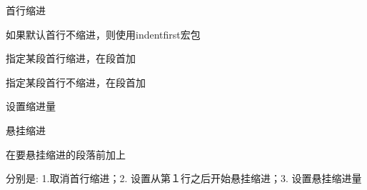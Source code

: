 \documentclass{article}
\begin{document}

\setlength{\parskip}{0.5\baselineskip}

首行缩进

如果默认首行不缩进，则使用indentfirst宏包


指定某段首行缩进，在段首加

\indent

指定某段首行不缩进，在段首加

\noindent
设置缩进量
\setlength\parindent{2em}

悬挂缩进

在要悬挂缩进的段落前加上

\noindent
{}
\setlength{\hangindent}{2em}

分别是: 1.取消首行缩进；2. 设置从第１行之后开始悬挂缩进；3. 设置悬挂缩进量
\end{document}
